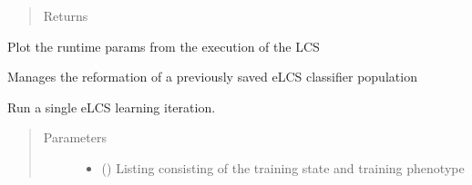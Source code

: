 \documentclass[letterpaper,10pt,english]{sphinxmanual}
\begin{document}
\begin{fulllineitems}
\begin{fulllineitems}
\begin{quote}
\begin{description}
\item[{Returns}] \leavevmode


\end{description}\end{quote}

\end{fulllineitems}


\begin{fulllineitems}
\label{\detokenize{eLCS:eLCS.Algorithm.Algorithm.getRuntimeParams}}
\end{fulllineitems}


\begin{fulllineitems}
\label{\detokenize{eLCS:eLCS.Algorithm.Algorithm.plotResult}}
Plot the runtime params from the execution of the LCS

\end{fulllineitems}


\begin{fulllineitems}
\label{\detokenize{eLCS:eLCS.Algorithm.Algorithm.populationReboot}}
Manages the reformation of a previously saved eLCS classifier population

\end{fulllineitems}


\begin{fulllineitems}
\label{\detokenize{eLCS:eLCS.Algorithm.Algorithm.runIteration}}
Run a single eLCS learning iteration.
\begin{quote}\begin{description}
\item[{Parameters}] \leavevmode\begin{itemize}
\item {} 
 () \textendash{} Listing consisting of the training state and training phenotype


\end{itemize}
\end{description}
\end{quote}
\end{fulllineitems}
\end{fulllineitems}
\end{document}
